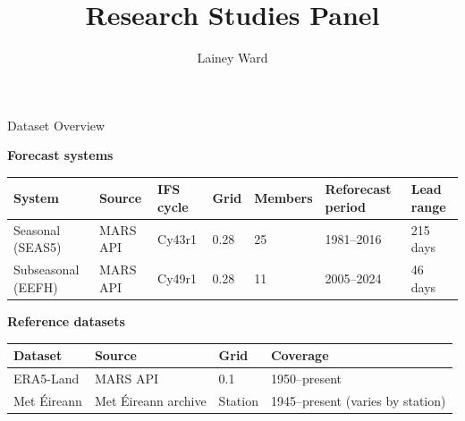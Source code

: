 \documentclass[aspectratio=169]{beamer}
\title[Research Studies Panel]{Research Studies Panel}
\author[Lainey Ward]{Lainey Ward}
\institute[]{}
\date{}
\begin{document}
\begin{frame}{Dataset Overview}

    \centering
    \vspace{-0.3em}

    {\footnotesize\textbf{Forecast systems}}
    \vspace{0.3em}

    \footnotesize
    \renewcommand{\arraystretch}{1.3}
    \begin{tabular}{l l l l l l l}
    \toprule
    \textbf{System} & \textbf{Source} & \textbf{IFS cycle} & \textbf{Grid} & \textbf{Members} & \textbf{Reforecast period} & \textbf{Lead range} \\
    \midrule
    Seasonal (SEAS5)       & MARS API & Cy43r1 & 0.28\textdegree{} & 25 & 1981--2016 & 215 days \\
    Subseasonal (EEFH)     & MARS API & Cy49r1 & 0.28\textdegree{} & 11 & 2005--2024 & 46 days  \\
    \bottomrule
    \end{tabular}

    \vspace{0.8em}

    {\footnotesize\textbf{Reference datasets}}
    \vspace{0.3em}

    \footnotesize
    \renewcommand{\arraystretch}{1.3}
    \begin{tabular}{l l l l}
    \toprule
    \textbf{Dataset} & \textbf{Source} & \textbf{Grid} & \textbf{Coverage} \\
    \midrule
    ERA5-Land     & MARS API              & 0.1\textdegree{} & 1950--present \\
    Met \'Eireann & Met \'Eireann archive & Station          & 1945--present (varies by station) \\
    \bottomrule
    \end{tabular}

    \vspace{0.8em}
    \scriptsize

\end{frame}
\end{document}
